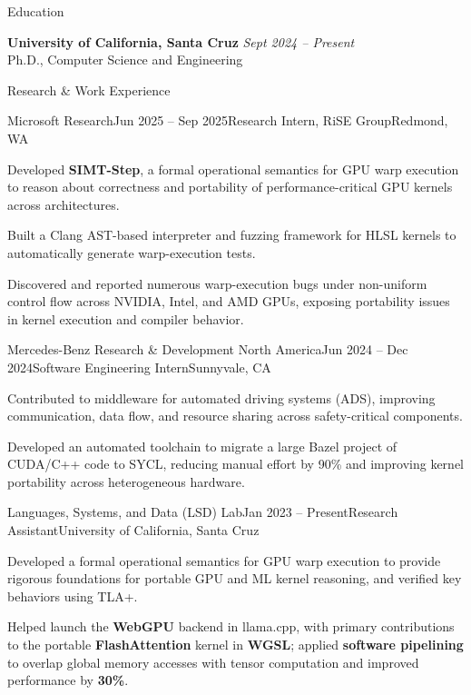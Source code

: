 \documentclass{resume}
\begin{document}
\begin{rSection}{Education}

{\bf University of California, Santa Cruz} \hfill {\em Sept 2024 -- Present} \\
Ph.D., Computer Science and Engineering

\end{rSection}

\begin{rSection}{Research \& Work Experience}

\begin{rSubsection}{Microsoft Research}{Jun 2025 -- Sep 2025}{Research Intern, RiSE Group}{Redmond, WA}
\item Developed \textbf{SIMT-Step}, a formal operational semantics for GPU warp execution to reason about correctness and portability of performance-critical GPU kernels across architectures.
\item Built a Clang AST-based interpreter and fuzzing framework for HLSL kernels to automatically generate warp-execution tests.
\item Discovered and reported numerous warp-execution bugs under non-uniform control flow across NVIDIA, Intel, and AMD GPUs, exposing portability issues in kernel execution and compiler behavior.
\end{rSubsection}

\begin{rSubsection}{Mercedes-Benz Research \& Development North America}{Jun 2024 -- Dec 2024}{Software Engineering Intern}{Sunnyvale, CA}
\item Contributed to middleware for automated driving systems (ADS), improving communication, data flow, and resource sharing across safety-critical components.
\item Developed an automated toolchain to migrate a large Bazel project of CUDA/C++ code to SYCL, reducing manual effort by 90\% and improving kernel portability across heterogeneous hardware.
\end{rSubsection}

\begin{rSubsection}{Languages, Systems, and Data (LSD) Lab}{Jan 2023 -- Present}{Research Assistant}{University of California, Santa Cruz}
\item Developed a formal operational semantics for GPU warp execution to provide rigorous foundations for portable GPU and ML kernel reasoning, and verified key behaviors using TLA+.
\item Helped launch the \textbf{WebGPU} backend in llama.cpp, with primary contributions to the portable \textbf{FlashAttention} kernel in \textbf{WGSL}; applied \textbf{software pipelining} to overlap global memory accesses with tensor computation and improved performance by \textbf{30\%}.

\end{rSubsection}

\end{rSection}
\end{document}
